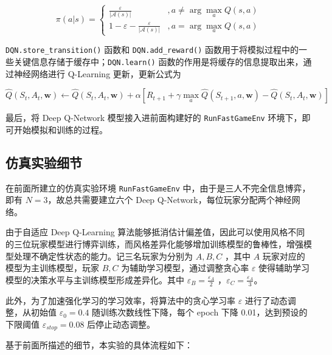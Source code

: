 \begin{equation}
    \pi(a|s)=
    \begin{cases}
        \frac{\varepsilon}{|\mathcal A(s)|}&, a\neq\arg\max_aQ(s,a)\\
        1-\varepsilon-\frac{\varepsilon}{|\mathcal A(s)|}&, a=\arg\max_aQ(s,a)
    \end{cases}
\end{equation}

\texttt{DQN.store\_transition()} 函数和 \texttt{DQN.add\_reward()} 函数用于将模拟过程中的一些关键信息存储于缓存中；\texttt{DQN.learn()} 函数的作用是将缓存的信息提取出来，通过神经网络进行 Q-Learning 更新，更新公式为

\begin{equation}
    \widehat{Q}(S_t,A_t,\boldsymbol{w})\leftarrow \widehat{Q}(S_t,A_t,\boldsymbol{w})+\alpha\left[R_{t+1}+\gamma  \max\limits_a \widehat{Q}(S_{t+1},a,\boldsymbol{w})-\widehat{Q}(S_t,A_t,\boldsymbol{w})\right]
\end{equation}

最后，将 Deep Q-Network 模型接入进前面构建好的 \texttt{RunFastGameEnv} 环境下，即可开始模拟和训练的过程。

\subsection{仿真实验细节}

在前面所建立的仿真实验环境 \texttt{RunFastGameEnv} 中，由于是三人不完全信息博弈，即有 $N=3$，故总共需要建立六个 Deep Q-Network，每位玩家分配两个神经网络。

由于自适应 Deep Q-Learning 算法能够抵消估计偏差值，因此可以使用风格不同的三位玩家模型进行博弈训练，而风格差异化能够增加训练模型的鲁棒性，增强模型处理不确定性状态的能力。记三名玩家为分别为 $A,B,C$ ，其中 $A$ 玩家对应的模型为主训练模型，玩家 $B,C$ 为辅助学习模型，通过调整贪心率 $\varepsilon$ 使得辅助学习模型的决策水平与主训练模型形成差异化。其中 $\varepsilon_B = \frac{\varepsilon_A}{2}$ ，$\varepsilon_C = \frac{\varepsilon_A}{3}$。

此外，为了加速强化学习的学习效率，将算法中的贪心学习率 $\varepsilon$ 进行了动态调整，从初始值 $\varepsilon_0 = 0.4$ 随训练次数线性下降，每个 epoch 下降 0.01，达到预设的下限阈值 $\varepsilon_{stop} = 0.08$ 后停止动态调整。

基于前面所描述的细节，本实验的具体流程如下：

